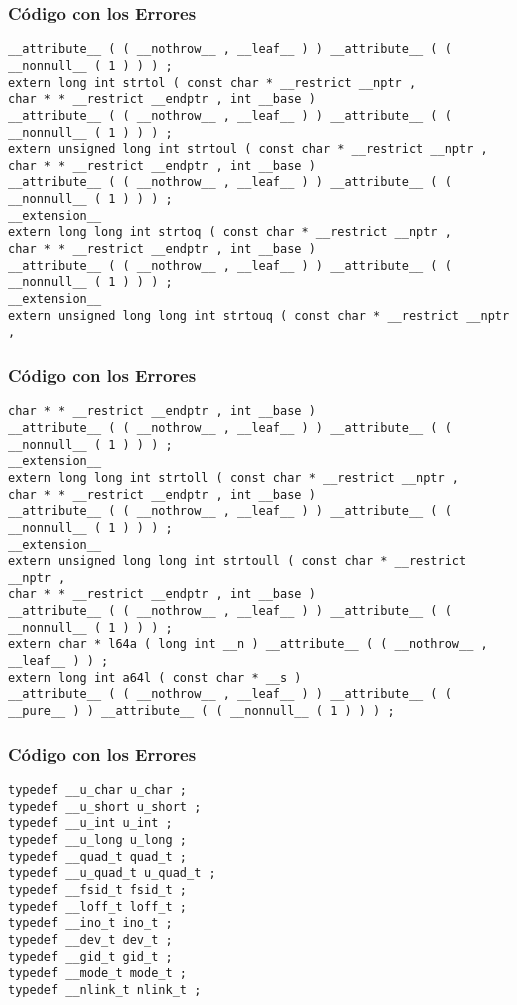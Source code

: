 \documentclass{beamer}
\begin{document}
\begin{frame}[fragile]
\frametitle{C\'odigo con los Errores}
\begin{lstlisting}[style=CStyle]
__attribute__ ( ( __nothrow__ , __leaf__ ) ) __attribute__ ( ( __nonnull__ ( 1 ) ) ) ; 
extern long int strtol ( const char * __restrict __nptr , 
char * * __restrict __endptr , int __base ) 
__attribute__ ( ( __nothrow__ , __leaf__ ) ) __attribute__ ( ( __nonnull__ ( 1 ) ) ) ; 
extern unsigned long int strtoul ( const char * __restrict __nptr , 
char * * __restrict __endptr , int __base ) 
__attribute__ ( ( __nothrow__ , __leaf__ ) ) __attribute__ ( ( __nonnull__ ( 1 ) ) ) ; 
__extension__ 
extern long long int strtoq ( const char * __restrict __nptr , 
char * * __restrict __endptr , int __base ) 
__attribute__ ( ( __nothrow__ , __leaf__ ) ) __attribute__ ( ( __nonnull__ ( 1 ) ) ) ; 
__extension__ 
extern unsigned long long int strtouq ( const char * __restrict __nptr , 
\end{lstlisting}
\end{frame}
\begin{frame}[fragile]
\frametitle{C\'odigo con los Errores}
\begin{lstlisting}[style=CStyle]
char * * __restrict __endptr , int __base ) 
__attribute__ ( ( __nothrow__ , __leaf__ ) ) __attribute__ ( ( __nonnull__ ( 1 ) ) ) ; 
__extension__ 
extern long long int strtoll ( const char * __restrict __nptr , 
char * * __restrict __endptr , int __base ) 
__attribute__ ( ( __nothrow__ , __leaf__ ) ) __attribute__ ( ( __nonnull__ ( 1 ) ) ) ; 
__extension__ 
extern unsigned long long int strtoull ( const char * __restrict __nptr , 
char * * __restrict __endptr , int __base ) 
__attribute__ ( ( __nothrow__ , __leaf__ ) ) __attribute__ ( ( __nonnull__ ( 1 ) ) ) ; 
extern char * l64a ( long int __n ) __attribute__ ( ( __nothrow__ , __leaf__ ) ) ; 
extern long int a64l ( const char * __s ) 
__attribute__ ( ( __nothrow__ , __leaf__ ) ) __attribute__ ( ( __pure__ ) ) __attribute__ ( ( __nonnull__ ( 1 ) ) ) ; 
\end{lstlisting}
\end{frame}
\begin{frame}[fragile]
\frametitle{C\'odigo con los Errores}
\begin{lstlisting}[style=CStyle]
typedef __u_char u_char ; 
typedef __u_short u_short ; 
typedef __u_int u_int ; 
typedef __u_long u_long ; 
typedef __quad_t quad_t ; 
typedef __u_quad_t u_quad_t ; 
typedef __fsid_t fsid_t ; 
typedef __loff_t loff_t ; 
typedef __ino_t ino_t ; 
typedef __dev_t dev_t ; 
typedef __gid_t gid_t ; 
typedef __mode_t mode_t ; 
typedef __nlink_t nlink_t ; 
\end{lstlisting}
\end{frame}
\end{document}

